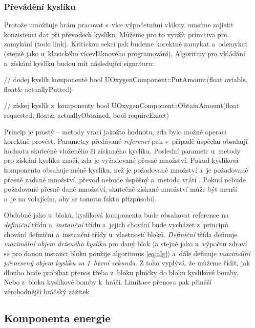 \subsubsection{Převádění kyslíku}
Protože \UE{} umožňuje hrám pracovat s~více výpočetními vlákny, musíme zajistit konzistenci dat při převodech kyslíku. Můžeme pro to využít primitiva pro zamykání  (todo link). Kritickou sekci pak budeme korektně zamykat a~odemykat (stejně jako u~klasického vícevláknového programování). Algoritmy pro vkládání a~získání kyslíku budou mít následující signaturu:

\begin{code}
    // dodej kyslík komponentě
    bool UOxygenComponent::PutAmount(float aviable,
                                     float& actuallyPutted)

    // získej kyslík z~komponenty                                     
    bool UOxygenComponent::ObtainAmount(float requested,
                                        float& actuallyObtained,
                                        bool requireExact)
\end{code}

Princip je prostý -- metody vrací  jakožto hodnotu, zda bylo možné operaci korektně provést. Parametry předávané \textit{referencí} pak v~případě úspěchu obsahují hodnotu skutečně vloženého či získaného kyslíku. Poslední parametr u~metody pro získání kyslíku značí, zda je vyžadované přesné množství. Pokud kyslíková komponenta obsahuje méně kyslíku, než je požadované množství a~je požadované přesně zadané množství, převod nebude úspěšný a~metoda vrátí . Pokud nebude požadované přesně dané množství, skutečně získané množství může být menší a~je na volajícím, aby se tomuto faktu přizpůsobil.

Obdobně jako u~bloků, kyslíková komponenta bude obsahovat reference na \textit{definiční} třídu a~\textit{instanční} třídu a~jejich chování bude vycházet z~principů chování definiční a~instanční třídy u~vlastností bloků. \textit{Definiční} třída definuje \textit{maximální objem drženého kyslíku} pro daný blok (a stejně jako u~výpočtu zdraví se pro danou instanci bloku použije algoritmus \ref{eq:alg}) a~dále definuje \textit{maximální přenesený objem kyslíku za 1~herní sekundu}. Z toho vyplývá, že můžeme řídit, jak dlouho bude probíhat přenos třeba z~bloku plničky do bloku kyslíkové bomby. Nebo z~bloku kyslíkové bomby k~hráči. Limitace přenosu pak přináší věrohodnější hráčský zážitek.

\subsection{Komponenta energie}

